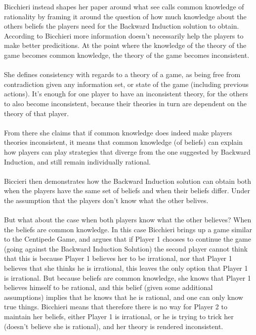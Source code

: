 \documentclass{article}
\begin{document}
Bicchieri instead shapes her paper around what see calls common knowledge of rationality by framing it around the question of how much knowledge about the others beliefs the players need for the Backward Induction solution to obtain. According to Bicchieri more information doesn't necessarily help the players to make better predicitions. At the point where the knowledge of the theory of the game becomes common knowledge, the theory of the game becomes inconsistent.
\\
\\
She defines consistency with regards to a theory of a game, as being free from contradiction given any information set, or state of the game (including previous actions). It's enough for one player to have an inconsistent theory, for the others to also become inconsistent, because their theories in turn are dependent on the theory of that player.
\\
\\
From there she claims that if common knowledge does indeed make players theories inconsistent, it means that common knowledge (of beliefs) can explain how players can play strategies that diverge from the one suggested by Backward Induction, and still remain individually rational.
\\
\\
Biccieri then demonstrates how the Backward Induction solution can obtain both when the players have the same set of beliefs and when their beliefs differ. Under the assumption that the players don't know what the other belives.
\\
\\
But what about the case when both players know what the other believes? When the beliefs are common knowledge. In this case Bicchieri brings up a game similar to the Centipede Game, and argues that if Player 1 chooses to continue the game (going against the Backward Induction Solution) the second player cannot think that this is because Player 1 believes her to be irrational, nor that Player 1 believes that she thinks he is irrational, this leaves the only option that Player 1 is irrational. But because beliefs are common knowledge, she knows that Player 1 believes himself to be rational, and this belief (given some additional assumptions) implies that he knows that he is rational, and one can only know true things. Bicchieri means that therefore there is no way for Player 2 to maintain her beliefs, either Player 1 is irrational, or he is trying to trick her (doesn't believe she is rational), and her theory is rendered inconsistent. 
\end{document}
